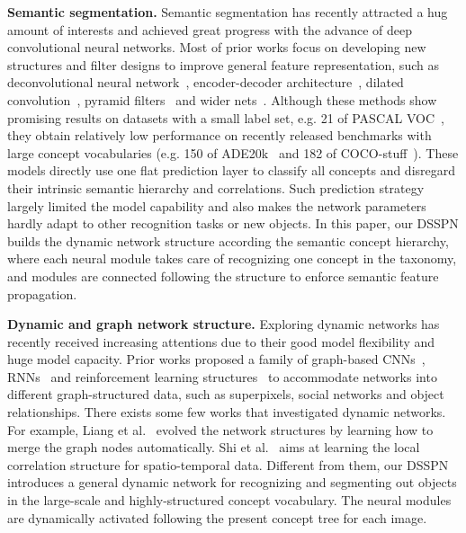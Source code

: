 \documentclass[10pt,twocolumn,letterpaper]{article}
\begin{document}
\textbf{Semantic segmentation.} Semantic segmentation has recently attracted a hug amount of interests and achieved great progress with the advance of deep convolutional neural networks. Most of prior works focus on developing new structures and filter designs to improve general feature representation, such as deconvolutional neural
network~\cite{noh2015learning}, encoder-decoder architecture~\cite{badrinarayanan2015segnet}, dilated convolution~\cite{chen2016deeplab,yu2015multi}, pyramid filters~\cite{zhao2016pyramid} and wider nets~\cite{wu2016wider}. Although these methods show promising results on datasets with a small label set, e.g. 21 of PASCAL VOC~\cite{everingham2010pascal}, they obtain relatively low performance on recently released benchmarks with large concept vocabularies (e.g. 150 of ADE20k~\cite{zhou2016semantic} and 182 of COCO-stuff~\cite{caesar2016coco}). These models directly use one flat prediction layer to classify all concepts and disregard their intrinsic semantic hierarchy and correlations. Such prediction strategy largely limited the model capability and also makes the network parameters hardly adapt to other recognition tasks or new objects. In this paper, our DSSPN builds the dynamic network structure according the semantic concept hierarchy, where each neural module takes care of recognizing one concept in the taxonomy, and modules are connected following the structure to enforce semantic feature propagation.

\textbf{Dynamic and graph network structure.} Exploring dynamic networks has recently received increasing attentions due to their good model flexibility and huge model capacity. Prior works proposed a family of graph-based CNNs~\cite{niepert2016learning}, RNNs~\cite{liang2016semantic} and reinforcement learning structures~\cite{liang2017deep} to accommodate networks into different graph-structured data, such as superpixels, social networks and object relationships. There exists some few works that investigated dynamic networks. For example, Liang et al.~\cite{liang2017interpretable} evolved the network structures by learning how to merge the graph nodes automatically. Shi et al.~\cite{shi2017deep} aims at learning the local correlation structure for spatio-temporal data. Different from them, our DSSPN introduces a general dynamic network for recognizing and segmenting out objects in the large-scale and highly-structured concept vocabulary. The neural modules are dynamically activated following the present concept tree for each image.
\end{document}

